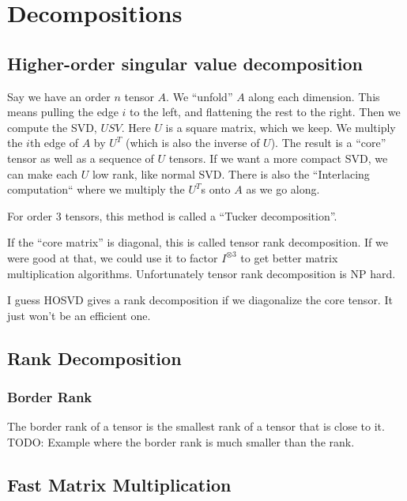 
\chapter{Decompositions}

\section{Higher-order singular value decomposition}
Say we have an order $n$ tensor $A$.
We ``unfold'' $A$ along each dimension.
This means pulling the edge $i$ to the left, and flattening the rest to the right.
Then we compute the SVD, $USV$.
Here $U$ is a square matrix, which we keep.
We multiply the $i$th edge of $A$ by $U^T$ (which is also the inverse of $U$).
The result is a ``core'' tensor as well as a sequence of $U$ tensors.
If we want a more compact SVD, we can make each $U$ low rank, like normal SVD.
There is also the ``Interlacing computation`` where we multiply the $U^T$s onto $A$ as we go along.

For order $3$ tensors, this method is called a ``Tucker decomposition''.

If the ``core matrix'' is diagonal, this is called tensor rank decomposition.
If we were good at that, we could use it to factor $I^{\otimes 3}$ to get better matrix multiplication algorithms.
Unfortunately tensor rank decomposition is NP hard.

I guess HOSVD gives a rank decomposition if we diagonalize the core tensor.
It just won't be an efficient one.

\section{Rank Decomposition}

\subsection{Border Rank}
The border rank of a tensor is the smallest rank of a tensor that is close to it.
TODO: Example where the border rank is much smaller than the rank.

\section{Fast Matrix Multiplication}

